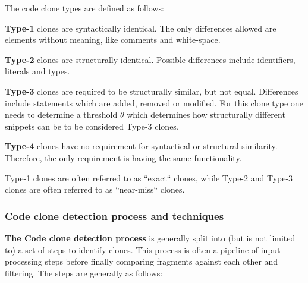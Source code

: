 \documentclass[12pt]{article}
\begin{document}
The code clone types are defined as follows:

\textbf{Type-1} clones are syntactically identical. The only differences allowed are elements
without meaning, like comments and white-space.

\textbf{Type-2} clones are structurally identical. Possible differences include
identifiers, literals and types.

\textbf{Type-3} clones are required to be structurally similar, but not equal. Differences
include statements which are added, removed or modified. For this clone type one needs to
determine a threshold $\theta$ which determines how structurally different snippets can be
to be considered Type-3 clones\cite{Inoue_introduction_to_cc}.

\textbf{Type-4} clones have no requirement for syntactical or structural similarity. Therefore,
the only requirement is having the same functionality.

Type-1 clones are often referred to as ``exact`` clones, while Type-2 and Type-3 clones are
often referred to as ``near-miss`` clones\cite[1]{Zibran_real_time_search}.

\subsubsection{Code clone detection process and techniques}

\textbf{The Code clone detection process} is generally split into (but is not limited to)
a set of steps to identify clones\cite{ComparisonAndEvaluationOfTechniques}. This
process is often a pipeline of input-processing steps before finally comparing fragments
against each other and filtering. The steps are generally as follows:
\end{document}

